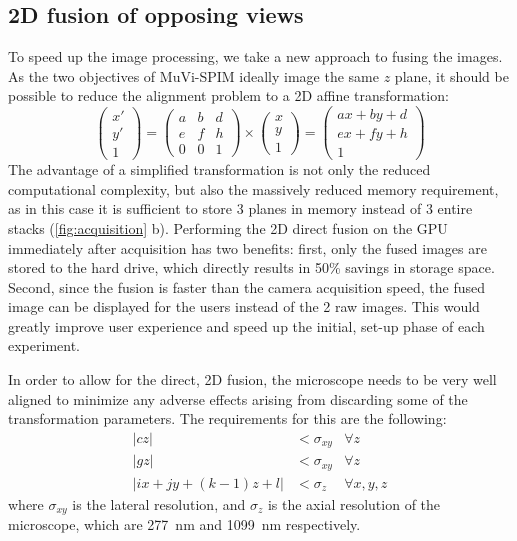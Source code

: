 \subsection{2D fusion of opposing views}
To speed up the image processing, we take a new approach to fusing the images. As the two objectives of MuVi-SPIM ideally image the same $z$ plane, it should be possible to reduce the alignment problem to a 2D affine transformation:
\[ 
\begin{pmatrix}
x'\\
y'\\
1
\end{pmatrix}
=
\begin{pmatrix}
a & b & d\\ 
e & f & h \\
0 & 0 & 1
\end{pmatrix}
\times
\begin{pmatrix}
x\\
y\\
1
\end{pmatrix}
=
\begin{pmatrix}
a x + b y + d\\ 
e x + f y + h\\
1
\end{pmatrix}
\]
The advantage of a simplified transformation is not only the reduced computational complexity, but also the massively reduced memory requirement, as in this case it is sufficient to store 3 planes in memory instead of 3 entire stacks (\autoref{fig:acquisition} b). Performing the 2D direct fusion on the GPU immediately after acquisition has two benefits: first, only the fused images are stored to the hard drive, which directly results in 50\% savings in storage space. Second, since the fusion is faster than the camera acquisition speed, the fused image can be displayed for the users instead of the 2 raw images. This would greatly improve user experience and speed up the initial, set-up phase of each experiment.

In order to allow for the direct, 2D fusion, the microscope needs to be very well aligned to minimize any adverse effects arising from discarding some of the transformation parameters. The requirements for this are the following:
\begin{align}
\left| c z \right| &< \sigma_{xy} & \forall z \label{eq:req1}\\
\left| g z \right|  &< \sigma_{xy} & \forall z \label{eq:req2}\\
\left| i x + j y + (k-1)  z + l \right| &< \sigma_z & \forall x, y, z  \label{eq:req3}
\end{align}
where $\sigma_{xy}$ is the lateral resolution, and $\sigma_z$ is the axial resolution of the microscope, which are \SI{277}{nm} and \SI{1099}{nm} respectively. 


